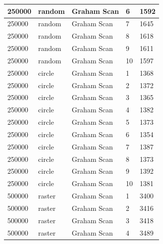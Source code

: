 \documentclass[12pt]{article}
\begin{document}
\begin{longtable}{|l|l|l|l|l|}
250000       & random            & Graham Scan & 6          & 1592                          \\ \hline
250000       & random            & Graham Scan & 7          & 1645                          \\ \hline
250000       & random            & Graham Scan & 8          & 1618                          \\ \hline
250000       & random            & Graham Scan & 9          & 1611                          \\ \hline
250000       & random            & Graham Scan & 10         & 1597                          \\ \hline
250000       & circle            & Graham Scan & 1          & 1368                          \\ \hline
250000       & circle            & Graham Scan & 2          & 1372                          \\ \hline
250000       & circle            & Graham Scan & 3          & 1365                          \\ \hline
250000       & circle            & Graham Scan & 4          & 1382                          \\ \hline
250000       & circle            & Graham Scan & 5          & 1373                          \\ \hline
250000       & circle            & Graham Scan & 6          & 1354                          \\ \hline
250000       & circle            & Graham Scan & 7          & 1387                          \\ \hline
250000       & circle            & Graham Scan & 8          & 1373                          \\ \hline
250000       & circle            & Graham Scan & 9          & 1392                          \\ \hline
250000       & circle            & Graham Scan & 10         & 1381                          \\ \hline
500000       & raster            & Graham Scan & 1          & 3400                          \\ \hline
500000       & raster            & Graham Scan & 2          & 3416                          \\ \hline
500000       & raster            & Graham Scan & 3          & 3418                          \\ \hline
500000       & raster            & Graham Scan & 4          & 3489                          \\ \hline

\end{longtable}
\end{document}
